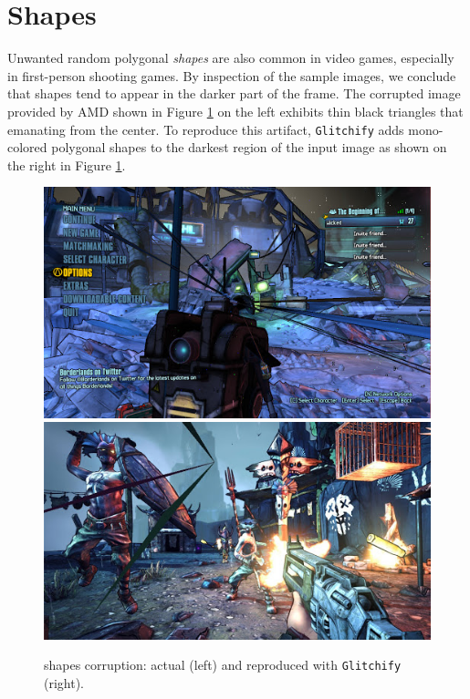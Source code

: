 \section*{Shapes}
Unwanted random polygonal \textit{shapes} are also common in video games, especially in first-person shooting games. By inspection of the sample images, we conclude that shapes tend to appear in the darker part of the frame. The corrupted image provided by AMD shown in Figure \ref{fig:shapes} on the left exhibits thin black triangles that emanating from the center. To reproduce this artifact, \texttt{Glitchify} adds mono-colored polygonal shapes to the darkest region of the input image as shown on the right in Figure \ref{fig:shapes}.
\begin{figure}[H]
\centering
\includegraphics[scale=0.405]{images/shapes1.jpg}
\includegraphics[scale=0.43]{images/shapes2.jpg}
\vspace{5pt}
\caption[Shape artifacts]{shapes corruption: actual (left) and reproduced with \texttt{Glitchify} (right).}
\label{fig:shapes}
\end{figure}
